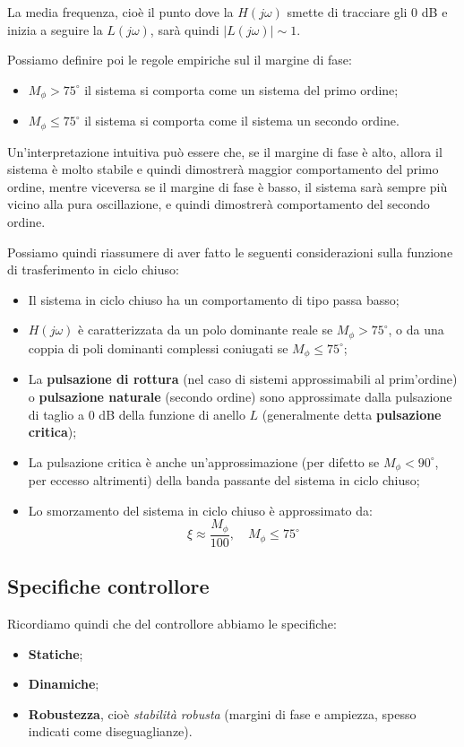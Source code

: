 \documentclass[a4paper,11pt]{article}
\begin{document}
\par\bigskip

La media frequenza, cioè il punto dove la $H(j\omega)$ smette di tracciare gli 0 dB e inizia a seguire la $L(j\omega)$, sarà quindi $|L(j\omega)| \sim 1$.

\par\smallskip

Possiamo definire poi le regole empiriche sul il margine di fase:
\begin{itemize}
	\item $M_\phi > 75^\circ$ il sistema si comporta come un sistema del primo ordine;
	\item $M_\phi \leq 75^\circ$ il sistema si comporta come il sistema un secondo ordine.
\end{itemize}

Un'interpretazione intuitiva può essere che, se il margine di fase è alto, allora il sistema è molto stabile e quindi dimostrerà maggior comportamento del primo ordine, mentre viceversa se il margine di fase è basso, il sistema sarà sempre più vicino alla pura oscillazione, e quindi dimostrerà comportamento del secondo ordine.

Possiamo quindi riassumere di aver fatto le seguenti considerazioni sulla funzione di trasferimento in ciclo chiuso:
\begin{itemize}
	\item Il sistema in ciclo chiuso ha un comportamento di tipo passa basso;
	\item $H(j\omega)$ è caratterizzata da un polo dominante reale se $M_\phi > 75^\circ$, o da una coppia di poli dominanti complessi coniugati se $M_\phi \leq 75^\circ$;
	\item La \textbf{pulsazione di rottura} (nel caso di sistemi approssimabili al prim'ordine) o \textbf{pulsazione naturale} (secondo ordine) sono approssimate dalla pulsazione di taglio a 0 dB della funzione di anello $L$ (generalmente detta \textbf{pulsazione critica});
	\item La pulsazione critica è anche un'approssimazione (per difetto se $M_\phi < 90^\circ$, per eccesso altrimenti) della banda passante del sistema in ciclo chiuso;
	\item Lo smorzamento del sistema in ciclo chiuso è approssimato da:
		$$
		\xi \approx \frac{M_\phi}{100}, \quad M_\phi \leq 75^\circ
		$$
\end{itemize}

\subsection{Specifiche controllore}
Ricordiamo quindi che del controllore abbiamo le specifiche:
\begin{itemize}
	\item \textbf{Statiche};
	\item \textbf{Dinamiche};
	\item \textbf{Robustezza}, cioè \textit{stabilità robusta} (margini di fase e ampiezza, spesso indicati come diseguaglianze).
\end{itemize}
\end{document}
